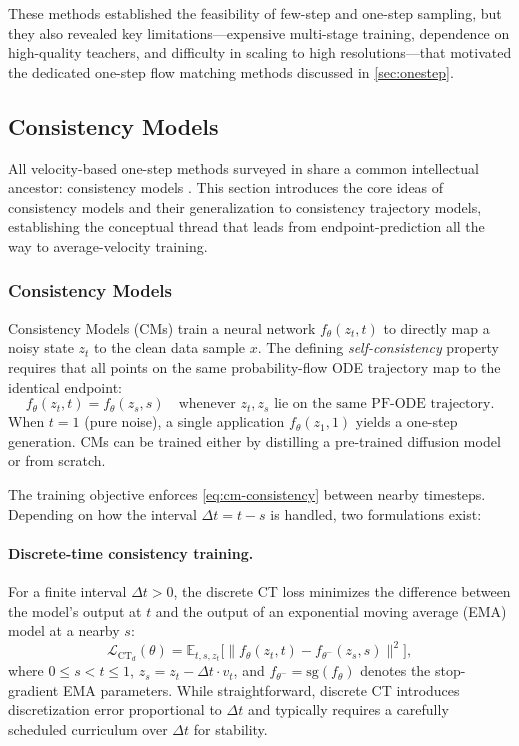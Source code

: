 These methods established the feasibility of few-step and one-step sampling, but they also revealed key limitations---expensive multi-stage training, dependence on high-quality teachers, and difficulty in scaling to high resolutions---that motivated the dedicated one-step flow matching methods discussed in \cref{sec:onestep}.

\subsection{Consistency Models}
\label{subsec:consistency-models}

All velocity-based one-step methods surveyed in  share a common intellectual ancestor: consistency models \citep{song2023consistency}. This section introduces the core ideas of consistency models and their generalization to consistency trajectory models, establishing the conceptual thread that leads from endpoint-prediction all the way to average-velocity training.

\subsubsection{Consistency Models}

Consistency Models (CMs) \citep{song2023consistency} train a neural network $f_\theta(z_t, t)$ to directly map a noisy state $z_t$ to the clean data sample $x$. The defining \emph{self-consistency} property requires that all points on the same probability-flow ODE trajectory map to the identical endpoint:
\begin{equation}
    f_\theta(z_t, t) = f_\theta(z_s, s) \quad \text{whenever } z_t, z_s \text{ lie on the same PF-ODE trajectory.}
    \label{eq:cm-consistency}
\end{equation}
When $t = 1$ (pure noise), a single application $f_\theta(z_1, 1)$ yields a one-step generation. CMs can be trained either by distilling a pre-trained diffusion model or from scratch.

The training objective enforces \cref{eq:cm-consistency} between nearby timesteps. Depending on how the interval $\Delta t = t - s$ is handled, two formulations exist:

\paragraph{Discrete-time consistency training.} For a finite interval $\Delta t > 0$, the discrete CT loss \citep{song2023consistency, geng2025cm} minimizes the difference between the model's output at $t$ and the output of an exponential moving average (EMA) model at a nearby $s$:
\begin{equation}
    \mathcal{L}_{\text{CT}_d}(\theta) = \mathbb{E}_{t, s, z_t} \Big[ \big\| f_\theta(z_t, t) - f_{\theta^-}(z_s, s) \big\|^2 \Big],
    \label{eq:ct-discrete}
\end{equation}
where $0 \le s < t \le 1$, $z_s = z_t - \Delta t \cdot v_t$, and $f_{\theta^-} = \text{sg}(f_\theta)$ denotes the stop-gradient EMA parameters. While straightforward, discrete CT introduces discretization error proportional to $\Delta t$ and typically requires a carefully scheduled curriculum over $\Delta t$ for stability.

